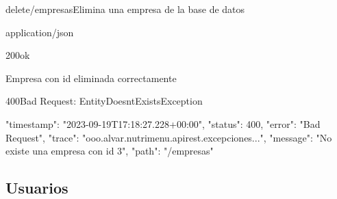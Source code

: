\begin{apiRoute}{delete}{/empresas}{Elimina una empresa de la base de datos}
	\begin{routeParameter}
	\end{routeParameter}
	\begin{routeResponse}{application/json}
		\begin{routeResponseItem}{200}{ok}
			\begin{routeResponseItemBody}
Empresa con id eliminada correctamente	
			\end{routeResponseItemBody}
		\end{routeResponseItem}
		
\begin{routeResponseItem}{400}{Bad Request: EntityDoesntExistsException}
			\begin{routeResponseItemBody}
{
    "timestamp": "2023-09-19T17:18:27.228+00:00",
    "status": 400,
    "error": "Bad Request",
    "trace": "ooo.alvar.nutrimenu.apirest.excepciones...",
    "message": "No existe una empresa con id 3",
    "path": "/empresas"
}
			\end{routeResponseItemBody}
		\end{routeResponseItem}
		
	\end{routeResponse}
\end{apiRoute}

\subsection{Usuarios}

